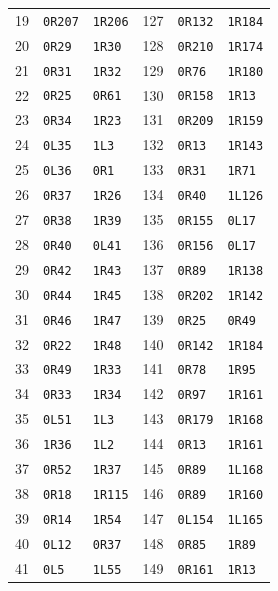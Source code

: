 \begin{longtable}{rll@{\hspace{2em}}rll}
19 & \texttt{0R207} & \texttt{1R206} & 127 & \texttt{0R132} & \texttt{1R184}\\
20 & \texttt{0R29} & \texttt{1R30} & 128 & \texttt{0R210} & \texttt{1R174}\\
21 & \texttt{0R31} & \texttt{1R32} & 129 & \texttt{0R76} & \texttt{1R180}\\
22 & \texttt{0R25} & \texttt{0R61} & 130 & \texttt{0R158} & \texttt{1R13}\\
23 & \texttt{0R34} & \texttt{1R23} & 131 & \texttt{0R209} & \texttt{1R159}\\
24 & \texttt{0L35} & \texttt{1L3} & 132 & \texttt{0R13} & \texttt{1R143}\\
25 & \texttt{0L36} & \texttt{0R1} & 133 & \texttt{0R31} & \texttt{1R71}\\
26 & \texttt{0R37} & \texttt{1R26} & 134 & \texttt{0R40} & \texttt{1L126}\\
27 & \texttt{0R38} & \texttt{1R39} & 135 & \texttt{0R155} & \texttt{0L17}\\
28 & \texttt{0R40} & \texttt{0L41} & 136 & \texttt{0R156} & \texttt{0L17}\\
29 & \texttt{0R42} & \texttt{1R43} & 137 & \texttt{0R89} & \texttt{1R138}\\
30 & \texttt{0R44} & \texttt{1R45} & 138 & \texttt{0R202} & \texttt{1R142}\\
31 & \texttt{0R46} & \texttt{1R47} & 139 & \texttt{0R25} & \texttt{0R49}\\
32 & \texttt{0R22} & \texttt{1R48} & 140 & \texttt{0R142} & \texttt{1R184}\\
33 & \texttt{0R49} & \texttt{1R33} & 141 & \texttt{0R78} & \texttt{1R95}\\
34 & \texttt{0R33} & \texttt{1R34} & 142 & \texttt{0R97} & \texttt{1R161}\\
35 & \texttt{0L51} & \texttt{1L3} & 143 & \texttt{0R179} & \texttt{1R168}\\
36 & \texttt{1R36} & \texttt{1L2} & 144 & \texttt{0R13} & \texttt{1R161}\\
37 & \texttt{0R52} & \texttt{1R37} & 145 & \texttt{0R89} & \texttt{1L168}\\
38 & \texttt{0R18} & \texttt{1R115} & 146 & \texttt{0R89} & \texttt{1R160}\\
39 & \texttt{0R14} & \texttt{1R54} & 147 & \texttt{0L154} & \texttt{1L165}\\
40 & \texttt{0L12} & \texttt{0R37} & 148 & \texttt{0R85} & \texttt{1R89}\\
41 & \texttt{0L5} & \texttt{1L55} & 149 & \texttt{0R161} & \texttt{1R13}\\

\end{longtable}
